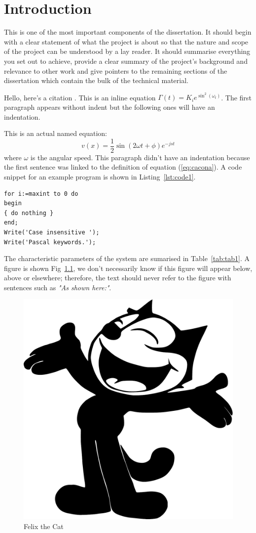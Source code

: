 \chapter{Introduction}
This is one of the most important components of the dissertation. It should begin with a clear statement of what the project is about so that the nature and scope of the project can be understood by a lay reader. It should summarise everything you set out to achieve, provide a clear summary of the project's background and relevance to other work and give pointers to the remaining sections of the dissertation which contain the bulk of the technical material.

Hello, here's a citation \cite{greenwade93}. This is an inline equation $\Gamma(t)=K_i e^{\sin^2(\omega_t)}$. The first paragraph appears without indent but the following ones will have an indentation.

This is an actual named equation:
\begin{equation}
v(x)=\frac{1}{2}\sin(2 \omega t + \phi) e^{-j s t}
\label{eq:cacona}
\end{equation}
\noindent where $\omega$ is the angular speed. This paragraph didn't have an indentation because the first sentence was linked to the definition of equation (\ref{eq:cacona}). A code snippet for an example program is shown in Listing~\ref{lst:code1}.

\begin{lstlisting}[caption=Source code for {\it hello.m},label=lst:code1,breaklines=true,basewidth=4pt,prebreak=**,postbreak=**,frame=single]
for i:=maxint to 0 do
begin
{ do nothing }
end;
Write('Case insensitive ');
Write('Pascal keywords.');
\end{lstlisting}

The characteristic parameters of the system are sumarised in Table~\ref{tab:tab1}. A figure is shown Fig~\ref{fig:felix}, we don't necessarily know if this figure will appear below, above or elsewhere; therefore, the text should never refer to the figure with sentences such as {\it "As shown here:"}.

\begin{figure}[htbp]
\centering
\includegraphics[width=0.3\linewidth]{introduction/fig/Felix_the_cat.pdf}
\caption{Felix the Cat}
\label{fig:felix}
\end{figure}


